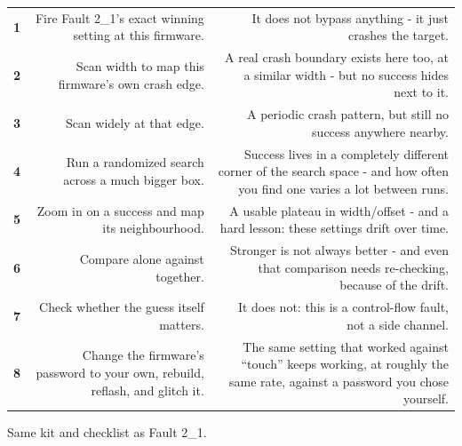 \documentclass[11pt,letterpaper]{article}
\begin{document}
{\small{}
\begin{longtable}{|R{0.1159}|R{0.3913}|R{0.4928}|}
\hline
{} &  &  \\ \hline
\endhead
\textbf{1} & Fire Fault 2\_1's exact winning setting at this firmware. & It does not bypass anything - it just crashes the target. \\ \hline
\textbf{2} & Scan width to map this firmware's own crash edge. & A real crash boundary exists here too, at a similar width - but no success hides next to it. \\ \hline
\textbf{3} & Scan  widely at that edge. & A periodic crash pattern, but still no success anywhere nearby. \\ \hline
\textbf{4} & Run a randomized search across a much bigger box. & Success lives in a completely different corner of the search space - and how often you find one varies a lot between runs. \\ \hline
\textbf{5} & Zoom in on a success and map its neighbourhood. & A usable plateau in width/offset - and a hard lesson: these settings drift over time. \\ \hline
\textbf{6} & Compare  alone against  together. & Stronger is not always better - and even that comparison needs re-checking, because of the drift. \\ \hline
\textbf{7} & Check whether the guess itself matters. & It does not: this is a control-flow fault, not a side channel. \\ \hline
\textbf{8} & Change the firmware's password to your own, rebuild, reflash, and glitch it. & The same setting that worked against ``touch'' keeps working, at roughly the same rate, against a password you chose yourself. \\ \hline
\end{longtable}}

\clearpage


Same kit and checklist as Fault 2\_1.
\end{document}
